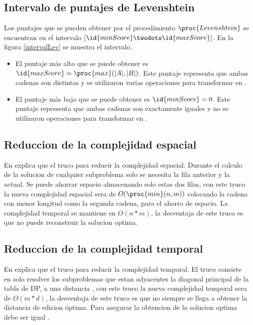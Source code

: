 \subsection{Intervalo de puntajes de Levenshtein}
Los puntajes que se pueden obtener por el procedimiento $\proc{Levenshtein}$ se encuentran en el intervalo $[\id{minScore} \twodots \id{maxScore}]$. En la figura \ref{intervalLev} se muestra el intervalo.

\begin{itemize}
  \item El puntaje más alto que se puede obtener es $\id{maxScore} = \proc{max}(|A|,|B|)$. Este puntaje representa que ambas cadenas son distintas y se utilizaron varias operaciones para transformar  en .
  \item El puntaje más bajo que se puede obtener es $\id{minScore} = 0$. Este puntaje representa que ambas cadenas son exactamente iguales y no se utilizaron operaciones para transformar  en .
\end{itemize}

\subsection{Reduccion de la complejidad espacial}
En \cite{Halim2019} explica que el truco para reducir la complejidad espacial. Durante el calculo de la solucion de cualquier subproblema solo se necesita la fila anterior y la actual. Se puede ahorrar espacio almacenando solo estas dos filas, con este truco la nueva complejidad espacial sera de $O(\proc{min}(n,m))$ colocando la cadena con menor longitud como la segunda cadena, para el ahorro de espacio. La complejidad temporal se mantiene en $O(n*m)$, la desventaja de este truco es que no puede reconstruir la solucion optima.

\subsection{Reduccion de la complejidad temporal}
En \cite{Halim2019} explica que el truco para reducir la complejidad temporal. El truco consiste en solo resolver los subproblemas que estan adyacentes la diagonal principal de la tabla de DP, a una distancia , con este truco la nueva complejidad temporal sera de $O(m * d)$, la desventaja de este truco es que no siempre se llega a obtener la distancia de edicion óptima. Para asegurar la obtencion de la solucion optima  debe ser igual .

